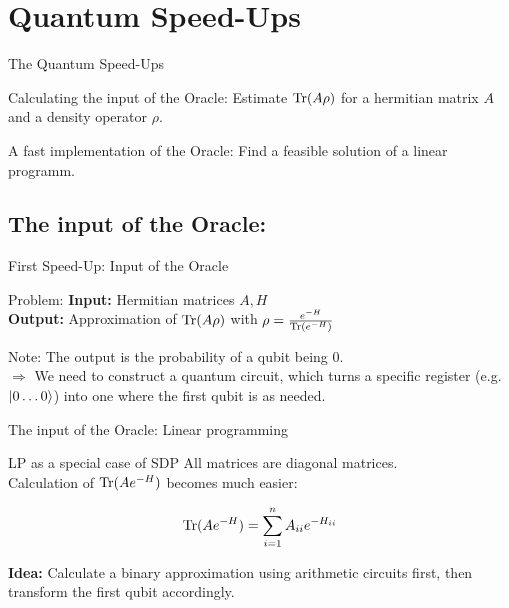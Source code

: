 \section{Quantum Speed-Ups}


\begin{frame}{The Quantum Speed-Ups}
 \begin{block}{Calculating the input of the Oracle:}
  Estimate $\operatorname{Tr}(A\rho)$ for a hermitian matrix $A$ and a density operator $\rho$.
 \end{block}
 
 \begin{block}{A fast implementation of the Oracle:}
  Find a feasible solution of a linear programm.
 \end{block}
\end{frame}

\subsection{The input of the Oracle:}

\begin{frame}{First Speed-Up: Input of the Oracle}
 \begin{block}{Problem:}
  \textbf{Input:} Hermitian matrices $A,H$ \\
  \textbf{Output:} Approximation of $\operatorname{Tr}(A\rho)$ with $\rho=\frac{e^{-H}}{\operatorname{Tr}(e^{-H})}$
 \end{block}
 
 \begin{block}{Note:}
  The output is the probability of a qubit being $0$.\\
  \alert{$\Rightarrow$ We need to construct a quantum circuit, which turns a specific register (e.g. $\ket{0\ldots 0}$) into one where the first qubit is as needed.}
 \end{block} 
\end{frame}

\begin{frame}{The input of the Oracle: Linear programming}
\begin{block}{LP as a special case of SDP}
All matrices are diagonal matrices.\\
\alert{Calculation of $\operatorname{Tr}(Ae^{-H})$ becomes much easier:}

\begin{equation*}
\operatorname{Tr}(Ae^{-H})=\sum_{i=1}^n A_{ii}e^{-H_{ii}}
\end{equation*}

\end{block}

\vspace{1cm}

\textbf{Idea:} Calculate a binary approximation using arithmetic circuits first, then transform the first qubit accordingly.

\end{frame}

